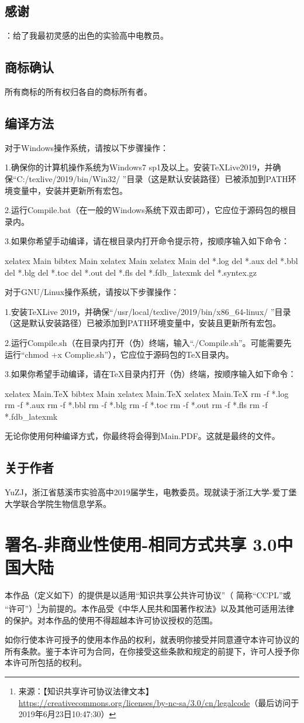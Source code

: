 \subsection{感谢}
：给了我最初灵感的出色的实验高中电教员。
\subsection{商标确认}
所有商标的所有权归各自的商标所有者。
\subsection{编译方法}
对于Windows操作系统，请按以下步骤操作：\par
1.确保你的计算机操作系统为Windows7 sp1及以上。安装TeXLive2019，并确保“C:/texlive/2019/bin/Win32/ ”目录（这是默认安装路径）已被添加到PATH环境变量中，安装并更新所有宏包。\par
2.运行Compile.bat（在一般的Windows系统下双击即可），它应位于源码包的根目录内。\par
3.如果你希望手动编译，请在根目录内打开命令提示符，按顺序输入如下命令：
\begin{verbatim*}
xelatex Main
bibtex Main
xelatex Main
xelatex Main
del *.log
del *.aux
del *.bbl
del *.blg
del *.toc
del *.out
del *.fls
del *.fdb_latexmk
del *.syntex.gz
\end{verbatim*}
对于GNU/Linux操作系统，请按以下步骤操作：\par
1.安装TeXLive 2019，并确保“/usr/local/texlive/2019/bin/x86\_64-linux/ ”目录（这是默认安装路径）已被添加到PATH环境变量中，安装且更新所有宏包。\par
2.运行Compile.sh（在目录内打开（伪）终端，输入“./Compile.sh”。可能需要先运行“chmod +x Complie.sh”），它应位于源码包的TeX目录内。\par
3.如果你希望手动编译，请在TeX目录内打开（伪）终端，按顺序输入如下命令：
\begin{verbatim*}
xelatex Main.TeX
bibtex Main
xelatex Main.TeX
xelatex Main.TeX
rm -f *.log
rm -f *.aux
rm -f *.bbl
rm -f *.blg
rm -f *.toc
rm -f *.out
rm -f *.fls
rm -f *.fdb_latexmk
\end{verbatim*}
无论你使用何种编译方式，你最终将会得到Main.PDF。这就是最终的文件。
\subsection{关于作者}
YuZJ，浙江省慈溪市实验高中2019届学生，电教委员。现就读于浙江大学-爱丁堡大学联合学院生物信息学系。
\section{署名-非商业性使用-相同方式共享 3.0中国大陆}
本作品（定义如下）的提供是以适用“知识共享公共许可协议”（ 简称“CCPL”或 “许可”）\footnote{来源：【知识共享许可协议法律文本】\url{https://creativecommons.org/licenses/by-nc-sa/3.0/cn/legalcode}（最后访问于2019年6月23日10:47:30）}为前提的。本作品受《中华人民共和国著作权法》以及其他可适用法律的保护。对本作品的使用不得超越本许可协议授权的范围。\par
如你行使本许可授予的使用本作品的权利，就表明你接受并同意遵守本许可协议的所有条款。鉴于本许可为合同，在你接受这些条款和规定的前提下，许可人授予你本许可所包括的权利。
